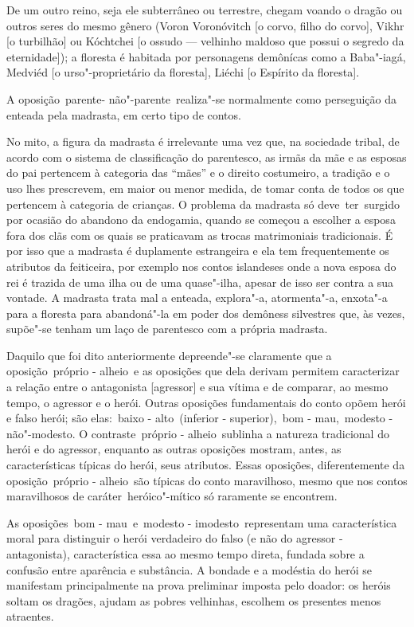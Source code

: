 De um outro reino, seja ele subterrâneo ou terrestre, chegam voando o
dragão ou outros seres do mesmo gênero (Voron Voronóvitch {[}o corvo,
filho do corvo{]}, Vikhr {[}o turbilhão{]} ou Kóchtchei {[}o ossudo ---
velhinho maldoso que possui o segredo da eternidade{]}); a floresta é
habitada por personagens demônícas como a Baba"-iagá, Medviéd {[}o
urso"-proprietário da floresta{]}, Liéchi {[}o Espírito da floresta{]}.

A oposição~{parente- não"-parente}~realiza"-se normalmente como
perseguição da enteada pela madrasta, em certo tipo de contos.

No mito, a figura da madrasta é irrelevante uma vez que, na sociedade
tribal, de acordo com o sistema de classificação do parentesco, as irmãs
da mãe e as esposas do pai pertencem à categoria das ``mães'' e o
direito costumeiro, a tradição e o uso lhes prescrevem, em maior ou
menor medida, de tomar conta de todos os que pertencem à categoria de
crianças. O problema da madrasta só deve~ter~surgido por ocasião do
abandono da endogamia, quando se começou a escolher a esposa fora dos
clãs com os quais se praticavam as trocas matrimoniais tradicionais. É
por isso que a madrasta é duplamente estrangeira e ela tem
frequentemente os atributos da feiticeira, por exemplo nos contos
islandeses onde a nova esposa do rei é trazida de uma ilha ou de uma
quase"-ilha, apesar de isso ser contra a sua vontade. A madrasta trata
mal a enteada, explora"-a, atormenta"-a, enxota"-a para a floresta para
abandoná"-la em poder dos demôness silvestres que, às vezes, supõe"-se
tenham um laço de parentesco com a própria madrasta.

Daquilo que foi dito anteriormente depreende"-se claramente que a
oposição~{próprio - alheio}~e as oposições que dela derivam permitem
caracterizar a relação entre o antagonista {[}agressor{]} e sua vítima e
de comparar, ao mesmo tempo, o agressor e o herói. Outras oposições
fundamentais do conto opõem herói e falso herói; são elas:~{baixo -
alto}~(inferior - superior),~{bom - mau},~{modesto - não"-modesto}. O
contraste~{próprio - alheio}~sublinha a natureza tradicional do herói e
do agressor, enquanto as outras oposições mostram, antes, as
características típicas do herói, seus atributos. Essas oposições,
diferentemente da oposição~{próprio - alheio}~são típicas do conto
maravilhoso, mesmo que nos contos maravilhosos de caráter~heróico"-mítico
só raramente se encontrem.

As oposições~{bom - mau}~e~{modesto - imodesto}~representam uma
característica moral para distinguir o herói verdadeiro do falso (e não
do agressor - antagonista), característica essa ao mesmo tempo direta,
fundada sobre a confusão entre aparência e substância. A bondade e a
modéstia do herói se manifestam principalmente na prova preliminar
imposta pelo doador: os heróis soltam os dragões, ajudam as pobres
velhinhas, escolhem os presentes menos atraentes.

